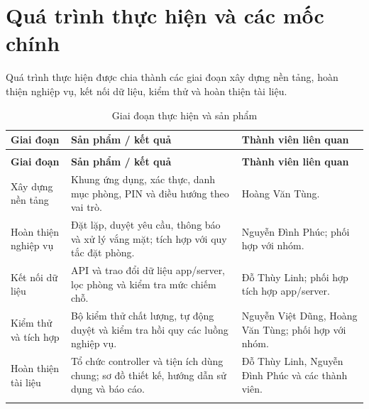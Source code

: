 \section{Quá trình thực hiện và các mốc chính}
Quá trình thực hiện được chia thành các giai đoạn xây dựng nền tảng, hoàn thiện nghiệp vụ, kết nối dữ liệu, kiểm thử và hoàn thiện tài liệu.
{\tabletext\renewcommand{\arraystretch}{1.04}\begin{longtable}{>{\raggedright\arraybackslash}p{}>{\raggedright\arraybackslash}p{}>{\raggedright\arraybackslash}p{}}
\caption{Giai đoạn thực hiện và sản phẩm}\label{tab:timeline}\\
\toprule \textbf{Giai đoạn} & \textbf{Sản phẩm / kết quả} & \textbf{Thành viên liên quan}\\\midrule
\endfirsthead
\multicolumn{3}{l}{\small Giai đoạn thực hiện và sản phẩm (tiếp)}\\
\toprule \textbf{Giai đoạn} & \textbf{Sản phẩm / kết quả} & \textbf{Thành viên liên quan}\\\midrule
\endhead
\bottomrule\endlastfoot
Xây dựng nền tảng & Khung ứng dụng, xác thực, danh mục phòng, PIN và điều hướng theo vai trò. & Hoàng Văn Tùng.\\\addlinespace[1.5pt]
Hoàn thiện nghiệp vụ & Đặt lặp, duyệt yêu cầu, thông báo và xử lý vắng mặt; tích hợp với quy tắc đặt phòng. & Nguyễn Đình Phúc; phối hợp với nhóm.\\\addlinespace[1.5pt]
Kết nối dữ liệu & API và trao đổi dữ liệu app/server, lọc phòng và kiểm tra mức chiếm chỗ. & Đỗ Thùy Linh; phối hợp tích hợp app/server.\\\addlinespace[1.5pt]
Kiểm thử và tích hợp & Bộ kiểm thử chất lượng, tự động duyệt và kiểm tra hồi quy các luồng nghiệp vụ. & Nguyễn Việt Dũng, Hoàng Văn Tùng; phối hợp với nhóm.\\\addlinespace[1.5pt]
Hoàn thiện tài liệu & Tổ chức controller và tiện ích dùng chung; sơ đồ thiết kế, hướng dẫn sử dụng và báo cáo. & Đỗ Thùy Linh, Nguyễn Đình Phúc và các thành viên.\\\addlinespace[1.5pt]
\end{longtable}}

